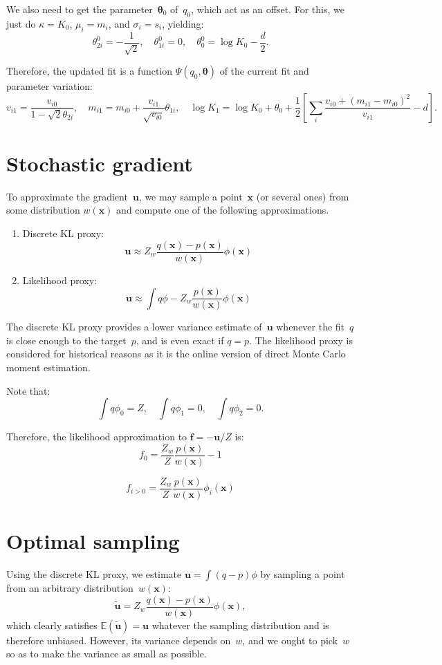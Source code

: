 \documentclass{article}
\def\x{\mathbf{x}}
\def\th{{\boldsymbol{\theta}}}
\def\u{\mathbf{u}}
\def\f{\mathbf{f}}
\def\E{\mathbb{E}}
\begin{document}
We also need to get the parameter~$\th_0$ of~$q_0$, which act as an offset. For this, we just do $\kappa=K_0$, $\mu_i=m_i$, and $\sigma_i=s_i$, yielding:
$$
\theta_{2i}^0=-\frac{1}{\sqrt{2}},
\quad
\theta_{1i}^0 = 0,
\quad
\theta_0^0 = \log K_0 - \frac{d}{2}.
$$

Therefore, the updated fit is a function $\Psi(q_0,\th)$ of the current fit and parameter variation:
$$
v_{i1} =  \frac{v_{i0}}{1-\sqrt{2}\theta_{2i}},
\quad
m_{i1} = m_{i0} + \frac{v_{i1}}{\sqrt{v_{i0}}} \theta_{1i},
\quad
\log K_1 = \log K_0 + \theta_0 + \frac{1}{2} \left[\sum_i \frac{v_{i0} + (m_{i1}-m_{i0})^2}{v_{i1}} - d\right].
$$

\section{Stochastic gradient}

To approximate the gradient~$\u$, we may sample a point~$\x$ (or several ones) from some distribution $w(\x)$ and compute one of the following approximations.
\begin{enumerate}
\item Discrete KL proxy:
$$
\u \approx Z_w \frac{q(\x)-p(\x)}{w(\x)} \phi(\x)
$$
\item Likelihood proxy:
$$
\u \approx \int q\phi - Z_w\frac{p(\x)}{w(\x)} 
\phi(\x)
$$
\end{enumerate}

The discrete KL proxy provides a lower variance estimate of~$\u$ whenever the fit~$q$ is close enough to the target~$p$, and is even exact if $q=p$. The likelihood proxy is considered for historical reasons as it is the online version of direct Monte Carlo moment estimation.

Note that:
$$
\int q\phi_0 = Z,
\quad
\int q\phi_1 = 0,
\quad
\int q\phi_2 = 0.
$$

Therefore, the likelihood approximation to $\f=-\u/Z$ is:
$$
f_0 = \frac{Z_w}{Z}\frac{p(\x)}{w(\x)} - 1 
$$

$$
f_{i>0} = \frac{Z_w}{Z}\frac{p(\x)}{w(\x)}\phi_i(\x) 
$$

\section{Optimal sampling}

Using the discrete KL proxy, we estimate $\u=\int (q-p)\phi$ by sampling a point from an arbitrary distribution~$w(\x)$:
$$
\tilde{\u} = Z_w \frac{q(\x)-p(\x)}{w(\x)} \phi(\x),
$$
which clearly satisfies $\E(\tilde{\u})=\u$ whatever the sampling distribution and is therefore unbiased. However, its variance depends on~$w$, and we ought to pick~$w$ so as to make the variance as small as possible. 
\end{document}

